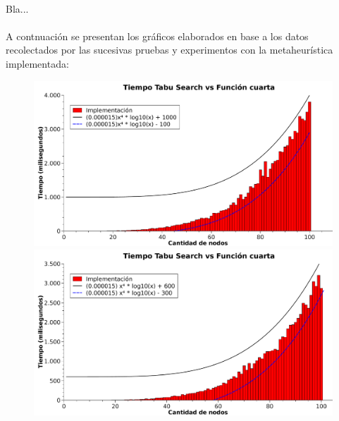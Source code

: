 \paragraph{}
Bla...

\paragraph{}
A contnuación se presentan los gráficos elaborados en base a los datos recolectados por las sucesivas pruebas y experimentos con la metaheurística implementada: \\

\begin{figure}[htb]

\begin{minipage}{\textwidth}
\begin{center}
	\includegraphics[width=\textwidth]{./otros/graficos/tiempo_100nodos1_ej5.pdf}
	\caption{}
	\label{ej5tiempo1}
\end{center}
\end{minipage}

\begin{minipage}{\textwidth}
\begin{center}
	\includegraphics[width=\textwidth]{./otros/graficos/tiempo_100nodos2_ej5.pdf}
	\caption{}
	\label{ej5tiempo2}
\end{center}
\end{minipage}


\end{figure}
